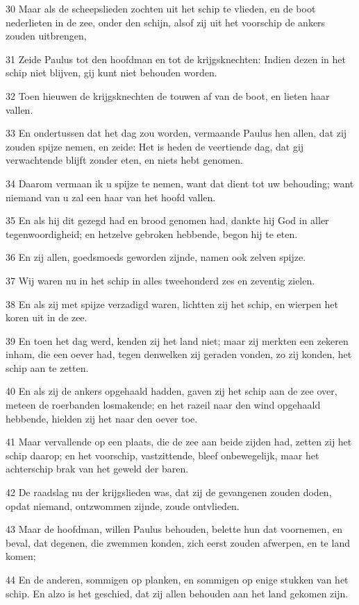 \par 30 Maar als de scheepslieden zochten uit het schip te vlieden, en de boot nederlieten in de zee, onder den schijn, alsof zij uit het voorschip de ankers zouden uitbrengen,
\par 31 Zeide Paulus tot den hoofdman en tot de krijgsknechten: Indien dezen in het schip niet blijven, gij kunt niet behouden worden.
\par 32 Toen hieuwen de krijgsknechten de touwen af van de boot, en lieten haar vallen.
\par 33 En ondertussen dat het dag zou worden, vermaande Paulus hen allen, dat zij zouden spijze nemen, en zeide: Het is heden de veertiende dag, dat gij verwachtende blijft zonder eten, en niets hebt genomen.
\par 34 Daarom vermaan ik u spijze te nemen, want dat dient tot uw behouding; want niemand van u zal een haar van het hoofd vallen.
\par 35 En als hij dit gezegd had en brood genomen had, dankte hij God in aller tegenwoordigheid; en hetzelve gebroken hebbende, begon hij te eten.
\par 36 En zij allen, goedsmoeds geworden zijnde, namen ook zelven spijze.
\par 37 Wij waren nu in het schip in alles tweehonderd zes en zeventig zielen.
\par 38 En als zij met spijze verzadigd waren, lichtten zij het schip, en wierpen het koren uit in de zee.
\par 39 En toen het dag werd, kenden zij het land niet; maar zij merkten een zekeren inham, die een oever had, tegen denwelken zij geraden vonden, zo zij konden, het schip aan te zetten.
\par 40 En als zij de ankers opgehaald hadden, gaven zij het schip aan de zee over, meteen de roerbanden losmakende; en het razeil naar den wind opgehaald hebbende, hielden zij het naar den oever toe.
\par 41 Maar vervallende op een plaats, die de zee aan beide zijden had, zetten zij het schip daarop; en het voorschip, vastzittende, bleef onbewegelijk, maar het achterschip brak van het geweld der baren.
\par 42 De raadslag nu der krijgslieden was, dat zij de gevangenen zouden doden, opdat niemand, ontzwommen zijnde, zoude ontvlieden.
\par 43 Maar de hoofdman, willen Paulus behouden, belette hun dat voornemen, en beval, dat degenen, die zwemmen konden, zich eerst zouden afwerpen, en te land komen;
\par 44 En de anderen, sommigen op planken, en sommigen op enige stukken van het schip. En alzo is het geschied, dat zij allen behouden aan het land gekomen zijn.

